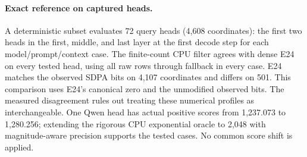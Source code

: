 \paragraph{Exact reference on captured heads.}
A deterministic subset evaluates 72 query heads (4,608 coordinates): the first two heads in the first, middle, and last layer at the first decode step for each model/prompt/context case. The finite-count CPU filter agrees with dense E24 on every tested head, using all raw rows through fallback in every case. E24 matches the observed SDPA bits on 4,107 coordinates and differs on 501. This comparison uses E24's canonical zero and the unmodified observed bits. The measured disagreement rules out treating these numerical profiles as interchangeable. One Qwen head has actual positive scores from 1,237.073 to 1,280.256; extending the rigorous CPU exponential oracle to 2,048 with magnitude-aware precision supports the tested cases. No common score shift is applied.
